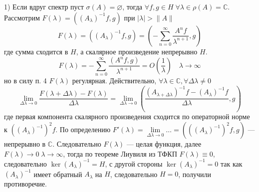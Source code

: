 \documentclass[12pt]{article}
\newcommand{\Al}{A_\lambda}
\newcommand{\Alo}{(\Al)^{-1}}
\begin{document}
\begin{Proof}
    1) Если вдруг спектр пуст $\sigma(A) = \varnothing$, тогда $\forall f, g \in H\;\forall \lambda \in  \rho(A) = \mathbb C$.
    Рассмотрим $F(\lambda) = (\Alo f, g)$ при $|\lambda| > \|A\|$
    $$
    F(\lambda) = (\Alo f, g) = (-\sum_{n = 0}^{\infty}
    \frac{A^n f}{\lambda^{n + 1}}, g)
    $$
    где сумма сходится в $H$, а скалярное произведение непрерывно $H$.
    $$
    F(\lambda) = -\sum_{n = 0}^{\infty} \frac{(A^n f, g)}{\lambda^{n + 1}} = O(\frac{1}{\lambda}) \quad \lambda \to \infty
    $$
    но в силу п. 4 $F(\lambda)$ регулярная.
    Действительно, $\forall \lambda \in \mathbb C, \forall \Delta\lambda \ne 0$
    $$
    \lim\limits_{\Delta\lambda \to 0} \frac{F(\lambda + \Delta\lambda) - F(\lambda)}
    {\Delta\lambda} = \lim\limits_{\Delta\lambda \to 0} (\frac{(A_{\lambda + \Delta\lambda})^{-1}f - \Alo f}{\Delta\lambda}, g)
    $$
    где первая компонента скалярного произведения сходится по операторной норме к $(\Alo)^2f$.
    По определению $F'(\lambda) = \lim\limits_{\Delta\lambda \to 0} \dots = ((\Alo)^2 f, g)$ --- непрерывно в $\mathbb C$.
    Следовательно $F(\lambda)$ --- целая функция, далее $F(\lambda) \to 0\;\lambda \to \infty$, тогда по теореме Лиувиля из ТФКП $F(\lambda) \equiv 0$,
    следовательно $\ker \Alo = H$, с другой стороны $\ker \Alo = 0$ так как $\Alo$ имеет обратный $\Al$ на $H$, следовательно $H = 0$, получили противоречие.
    

\end{Proof}
\end{document}
